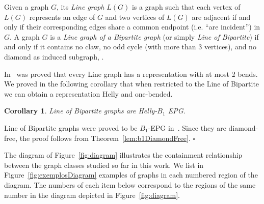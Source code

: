 \documentclass[9pt]{entcs}
\newtheorem{coro}[thm]{Corollary}%
\begin{document}
Given a graph $G$, its \textit{Line graph} $L(G)$ is a graph such that each vertex of $L(G)$ represents an edge of $G$ and
  two vertices of $L(G)$ are adjacent if and only if their corresponding edges share a common endpoint (i.e. ``are incident'') in $G$.  
A graph $G$ is a \textit{Line graph of a Bipartite graph} (or simply \textit{Line of Bipartite}) if and only if it
contains no claw, no odd cycle (with more than 3 vertices), and no diamond as induced subgraph, \cite{harary1974line}.

In~\cite{daniel2014b} was proved that every Line graph has a representation with at most 2 bends. We proved in the following corollary that when restricted to the Line of Bipartite we can obtain a representation Helly and one-bended.

\begin{coro}\label{coro:lineOfBipartite}
 Line of Bipartite graphs are Helly-$B_1$ EPG. 
\end{coro}

\begin{pf}
Line of Bipartite graphs were proved to be $B_1$-EPG in~\cite{golumbic2018edge}. Since they are diamond-free, the proof follows from Theorem~\ref{lem:b1DiamondFree}.
 \hfill $\square$
\end{pf}

The diagram of Figure~\ref{fig:diagram}
illustrates the containment relationship between the graph classes  studied so far in this work. 
We list in Figure~\ref{fig:exemplosDiagram} examples of graphs in each numbered region of the diagram. The numbers of each item below correspond to the regions of the same number in the diagram depicted in Figure~\ref{fig:diagram}.

\end{document}
